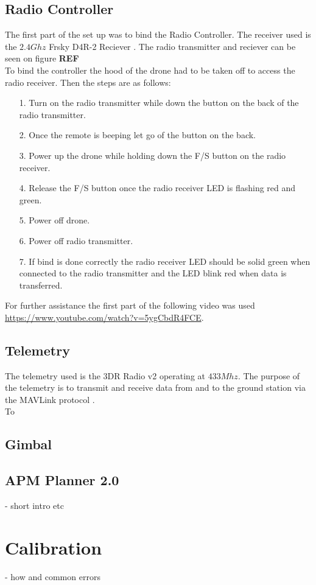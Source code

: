 \subsection{Radio Controller}
The first part of the set up was to bind the Radio Controller. The receiver used is the $2.4 Ghz$ Frsky D4R-2 Reciever \cite{Ref:FrSky}. The radio transmitter and reciever can be seen on figure \textbf{REF}\\ 
To bind the controller the hood of the drone had to be taken off to access the radio receiver. Then the steps are as follows:
\begin{itemize}
\item[1.] Turn on the radio transmitter while down the button on the back of the radio transmitter.
\item[2.] Once the remote is beeping let go of the button on the back.
\item[3.] Power up the drone while holding down the F/S button on the radio receiver.
\item[4.] Release the F/S button once the radio receiver LED is flashing red and green.
\item[5.] Power off drone.
\item[6.] Power off radio transmitter.
\item[7.] If bind is done correctly the radio receiver LED should be solid green when connected to the radio transmitter and the LED blink red when data is transferred.
\end{itemize}
For further assistance the first part of the following video was used \url{https://www.youtube.com/watch?v=5ygCbdR4FCE}.

\subsection{Telemetry}
The telemetry used is the 3DR Radio v2 \cite{Ref:Telem} operating at $433 Mhz$. The purpose of the telemetry is to transmit and receive data from and to the ground station via the MAVLink protocol \cite{Ref:MAVLink}.\\
To  
\subsection{Gimbal}
\subsection{APM Planner 2.0}
- short intro etc \\
\section{Calibration}
- how and common errors\\
